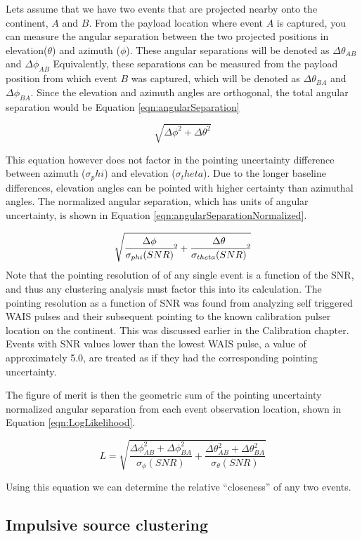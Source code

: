 		
		Lets assume that we have two events that are projected nearby onto the continent, $A$ and $B$.  From the payload location where event $A$ is captured, you can measure the angular separation between the two projected positions in elevation($\theta$) and azimuth ($\phi$).  These angular separations will be denoted as $\Delta\theta_{AB}$ and $\Delta\phi_{AB}$  Equivalently, these separations can be measured from the payload position from which event $B$ was captured, which will be denoted as $\Delta\theta_{BA}$ and $\Delta\phi_{BA}$.  Since the elevation and azimuth angles are orthogonal, the total angular separation would be Equation \ref{eqn:angularSeparation}
		
	\begin{equation}
		\sqrt{\Delta\phi^2 + \Delta\theta^2}
		\label{eqn:angularSeparation}
	\end{equation}
	
	This equation however does not factor in the pointing uncertainty difference between azimuth ($\sigma_phi$) and elevation ($\sigma_theta$). Due to the longer baseline differences, elevation angles can be pointed with higher certainty than azimuthal angles.  The normalized angular separation, which has units of angular uncertainty, is shown in Equation \ref{eqn:angularSeparationNormalized}.
	
	\begin{equation}
		\sqrt{\cfrac{\Delta\phi}{\sigma_{phi}(SNR)}^2 + \cfrac{\Delta\theta}{\sigma_{theta}(SNR)}^2}
		\label{eqn:angularSeparationNormalized}
	\end{equation}
		Note that the pointing resolution  of of any single event is a function of the SNR, and thus any clustering analysis must factor this into its calculation.  The pointing resolution as a function of SNR was found from analyzing self triggered WAIS pulses and their subsequent pointing to the known calibration pulser location on the continent.  This was discussed earlier in the Calibration chapter.  Events with SNR values lower than the lowest WAIS pulse, a value of approximately 5.0, are treated as if they had the corresponding pointing uncertainty.
		
		The figure of merit is then the geometric sum of the pointing uncertainty normalized angular separation from each event observation location, shown in Equation \ref{eqn:LogLikelihood}.
		
	\begin{equation}
		L = \sqrt{\frac{\Delta\phi_{AB}^2   + \Delta\phi_{BA}^2}{\sigma_{\phi}(SNR)} + \frac{\Delta\theta_{AB}^2 + \Delta\theta_{BA}^2}{\sigma_{\theta}(SNR)}}
		\label{eqn:LogLikelihood}
	\end{equation}


		Using this equation we can determine the relative ``closeness'' of any two events.  
		
	
	\subsection{Impulsive source clustering}
	



	